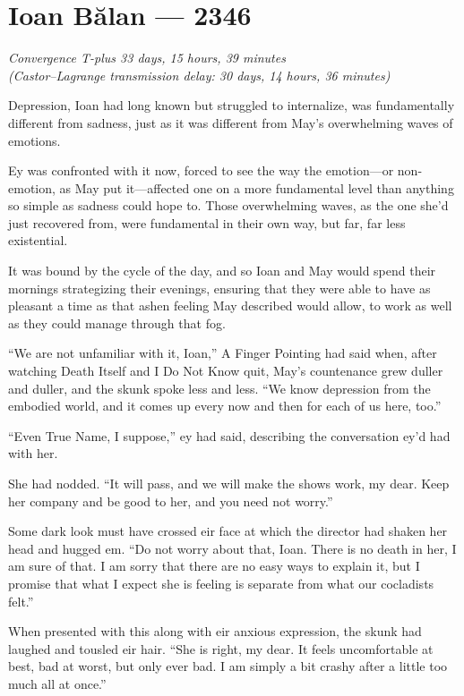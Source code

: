 \hypertarget{ioan-bux103lan-2346}{%
\chapter{Ioan Bălan — 2346}}

\begin{center}
\emph{Convergence T-plus 33 days, 15 hours, 39 minutes}\\
\emph{(Castor--Lagrange transmission delay: 30 days, 14 hours, 36 minutes)}
\end{center}

\noindent Depression, Ioan had long known but struggled to internalize, was fundamentally different from sadness, just as it was different from May's overwhelming waves of emotions.

Ey was confronted with it now, forced to see the way the emotion—or non-emotion, as May put it—affected one on a more fundamental level than anything so simple as sadness could hope to. Those overwhelming waves, as the one she'd just recovered from, were fundamental in their own way, but far, far less existential.

It was bound by the cycle of the day, and so Ioan and May would spend their mornings strategizing their evenings, ensuring that they were able to have as pleasant a time as that ashen feeling May described would allow, to work as well as they could manage through that fog.

``We are not unfamiliar with it, Ioan,'' A Finger Pointing had said when, after watching Death Itself and I Do Not Know quit, May's countenance grew duller and duller, and the skunk spoke less and less. ``We know depression from the embodied world, and it comes up every now and then for each of us here, too.''

``Even True Name, I suppose,'' ey had said, describing the conversation ey'd had with her.

She had nodded. ``It will pass, and we will make the shows work, my dear. Keep her company and be good to her, and you need not worry.''

Some dark look must have crossed eir face at which the director had shaken her head and hugged em. ``Do not worry about that, Ioan. There is no death in her, I am sure of that. I am sorry that there are no easy ways to explain it, but I promise that what I expect she is feeling is separate from what our cocladists felt.''

When presented with this along with eir anxious expression, the skunk had laughed and tousled eir hair. ``She is right, my dear. It feels uncomfortable at best, bad at worst, but only ever bad. I am simply a bit crashy after a little too much all at once.''

